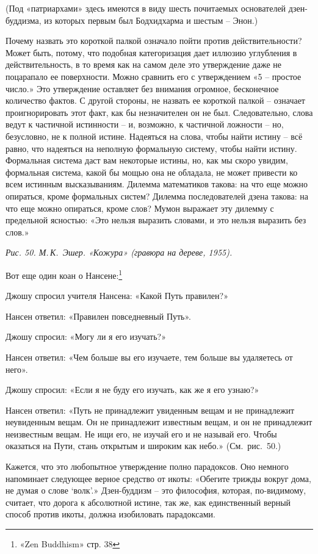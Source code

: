 \documentclass[../main.tex]{subfiles}
\begin{document}
(Под «патриархами» здесь имеются в виду шесть почитаемых основателей дзен-буддизма, из которых первым был Бодхидхарма и шестым \--- Энон.)

Почему назвать это короткой палкой означало пойти против действительности? Может быть, потому, что подобная категоризация дает иллюзию углубления в действительность, в то время как на самом деле это утверждение даже не поцарапало ее поверхности. Можно сравнить его с утверждением «5 \--- простое число.» Это утверждение оставляет без внимания огромное, бесконечное количество фактов. С другой стороны, не назвать ее короткой палкой \--- означает проигнорировать этот факт, как бы незначителен он не был. Следовательно, слова ведут к частичной истинности \--- и, возможно, к частичной ложности \--- но, безусловно, не к полной истине. Надеяться на слова, чтобы найти истину \--- всё равно, что надеяться на неполную формальную систему, чтобы найти истину. Формальная система даст вам некоторые истины, но, как мы скоро увидим, формальная система, какой бы мощью она не обладала, не может привести ко всем истинным высказываниям. Дилемма математиков такова: на что еще можно опираться, кроме формальных систем? Дилемма последователей дзена такова: на что еще можно опираться, кроме слов? Мумон выражает эту дилемму с предельной ясностью: «Это нельзя выразить словами, и это нельзя выразить без слов.»

\emph{Рис. 50. М.\,К.~Эшер. «Кожура» (гравюра на дереве, 1955).}

Вот еще один коан о Нансене:\footnote{«Zen Buddhism» стр. 38}

\begin{koan}
    Джошу спросил учителя Нансена: «Какой Путь правилен?»

    Нансен ответил: «Правилен повседневный Путь».

    Джошу спросил: «Могу ли я его изучать?»

    Нансен ответил: «Чем больше вы его изучаете, тем больше вы удаляетесь от него».

    Джошу спросил: «Если я не буду его изучать, как же я его узнаю?»

    Нансен ответил: «Путь не принадлежит увиденным вещам и не принадлежит неувиденным вещам. Он не принадлежит известным вещам, и он не принадлежит неизвестным вещам. Не ищи его, не изучай его и не называй его. Чтобы оказаться на Пути, стань открытым и широким как небо.» (См.~рис.~50.)
\end{koan}

Кажется, что это любопытное утверждение полно парадоксов. Оно немного напоминает следующее верное средство от икоты: «Обегите трижды вокруг дома, не думая о слове \enquote*{волк}.» Дзен-буддизм \--- это философия, которая, по-видимому, считает, что дорога к абсолютной истине, так же, как единственный верный способ против икоты, должна изобиловать парадоксами.
\end{document}
